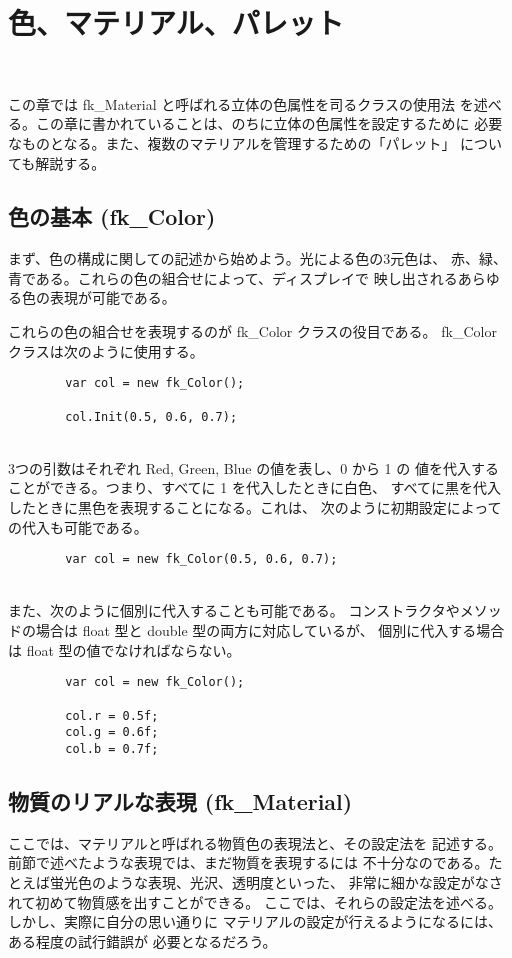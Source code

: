 \chapter{色、マテリアル、パレット} \label{sec:material} ~

この章では fk\_Material と呼ばれる立体の色属性を司るクラスの使用法
を述べる。この章に書かれていることは、のちに立体の色属性を設定するために
必要なものとなる。また、複数のマテリアルを管理するための「パレット」
についても解説する。
\section{色の基本 (fk\_Color)}
まず、色の構成に関しての記述から始めよう。光による色の3元色は、
赤、緑、青である。これらの色の組合せによって、ディスプレイで
映し出されるあらゆる色の表現が可能である。

これらの色の組合せを表現するのが fk\_Color クラスの役目である。
fk\_Color クラスは次のように使用する。
\\
\begin{screen}
\begin{verbatim}
        var col = new fk_Color();

        col.Init(0.5, 0.6, 0.7);
\end{verbatim}
\end{screen}
~ \\
3つの引数はそれぞれ Red, Green, Blue の値を表し、0 から 1 の
値を代入することができる。つまり、すべてに 1 を代入したときに白色、
すべてに黒を代入したときに黒色を表現することになる。これは、
次のように初期設定によっての代入も可能である。
\\
\begin{screen}
\begin{verbatim}
        var col = new fk_Color(0.5, 0.6, 0.7);
\end{verbatim}
\end{screen}
~ \\
また、次のように個別に代入することも可能である。
コンストラクタやメソッドの場合は float 型と double 型の両方に対応しているが、
個別に代入する場合は float 型の値でなければならない。
\\
\begin{screen}
\begin{verbatim}
        var col = new fk_Color();

        col.r = 0.5f;
        col.g = 0.6f;
        col.b = 0.7f;
\end{verbatim}
\end{screen}
\section{物質のリアルな表現 (fk\_Material)}
ここでは、マテリアルと呼ばれる物質色の表現法と、その設定法を
記述する。前節で述べたような表現では、まだ物質を表現するには
不十分なのである。たとえば蛍光色のような表現、光沢、透明度といった、
非常に細かな設定がなされて初めて物質感を出すことができる。
ここでは、それらの設定法を述べる。しかし、実際に自分の思い通りに
マテリアルの設定が行えるようになるには、ある程度の試行錯誤が
必要となるだろう。

